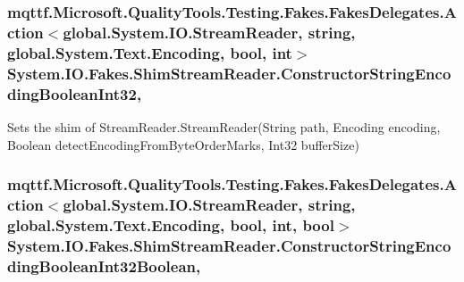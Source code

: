 \hypertarget{class_system_1_1_i_o_1_1_fakes_1_1_shim_stream_reader_a14bc1e4606fa7048675cb000c4acb876}{
\subsubsection[{Constructor\-String\-Encoding\-Boolean\-Int32}]{\setlength{\rightskip}{0pt plus 5cm}mqttf.\-Microsoft.\-Quality\-Tools.\-Testing.\-Fakes.\-Fakes\-Delegates.\-Action$<$global.\-System.\-I\-O.\-Stream\-Reader, string, global.\-System.\-Text.\-Encoding, bool, int$>$ System.\-I\-O.\-Fakes.\-Shim\-Stream\-Reader.\-Constructor\-String\-Encoding\-Boolean\-Int32\hspace{0.3cm}{\ttfamily [static]}, {\ttfamily [set]}}}\label{class_system_1_1_i_o_1_1_fakes_1_1_shim_stream_reader_a14bc1e4606fa7048675cb000c4acb876}


Sets the shim of Stream\-Reader.\-Stream\-Reader(\-String path, Encoding encoding, Boolean detect\-Encoding\-From\-Byte\-Order\-Marks, Int32 buffer\-Size)

\hypertarget{class_system_1_1_i_o_1_1_fakes_1_1_shim_stream_reader_aa4499d737326afe62c6094239b32c5fe}{
\subsubsection[{Constructor\-String\-Encoding\-Boolean\-Int32\-Boolean}]{\setlength{\rightskip}{0pt plus 5cm}mqttf.\-Microsoft.\-Quality\-Tools.\-Testing.\-Fakes.\-Fakes\-Delegates.\-Action$<$global.\-System.\-I\-O.\-Stream\-Reader, string, global.\-System.\-Text.\-Encoding, bool, int, bool$>$ System.\-I\-O.\-Fakes.\-Shim\-Stream\-Reader.\-Constructor\-String\-Encoding\-Boolean\-Int32\-Boolean\hspace{0.3cm}{\ttfamily [static]}, {\ttfamily [set]}}}\label{class_system_1_1_i_o_1_1_fakes_1_1_shim_stream_reader_aa4499d737326afe62c6094239b32c5fe}


